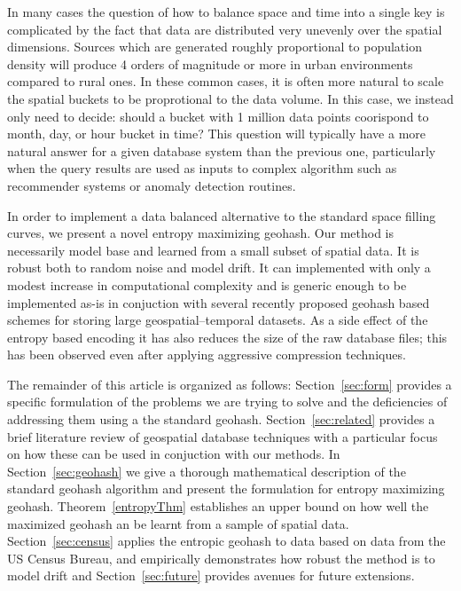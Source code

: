 \documentclass[nips13submit_09,times,art10]{article} %
\begin{document}
In many cases the question of how to balance space and time into a single key is complicated
by the fact that data are distributed very unevenly over the spatial dimensions. Sources
which are generated roughly proportional to population density will produce 4 orders of
magnitude or more in urban environments compared to rural ones. In these common cases, it
is often more natural to scale the spatial buckets to be proprotional to the data volume.
In this case, we instead only need to decide: should a bucket with 1 million data points
coorispond to month, day, or hour bucket in time? This question will typically have a more
natural answer for a given database system than the previous one, particularly when the
query results are used as inputs to complex algorithm such as recommender systems or
anomaly detection routines.

In order to implement a data balanced alternative to the standard space filling curves,
we present a novel entropy maximizing geohash. Our method is necessarily model base and
learned from a small subset of spatial data. It is robust both to random noise and
model drift. It can implemented with only a modest increase in computational complexity
and is generic enough to be implemented as-is in conjuction with several recently
proposed geohash based schemes for storing large geospatial--temporal datasets. As a
side effect of the entropy based encoding it has also reduces the size of the raw database
files; this has been observed even after applying aggressive compression techniques.

The remainder of this article is organized as follows: Section~\ref{sec:form}
provides a specific formulation of the problems we are trying to solve and the
deficiencies of addressing them using a the standard geohash.
Section~\ref{sec:related} provides a brief literature review of geospatial
database techniques with a particular focus on how these can be used in conjuction
with our methods.
In Section~\ref{sec:geohash} we give a thorough mathematical description of the standard
geohash algorithm and present the formulation for entropy maximizing geohash.
Theorem~\ref{entropyThm} establishes an upper bound on how well the maximized geohash
an be learnt from a sample of spatial data. Section~\ref{sec:census} applies the
entropic geohash to data based on data from the US Census Bureau, and empirically
demonstrates how robust the method is to model drift and Section~\ref{sec:future}
provides avenues for future extensions.
\end{document}
